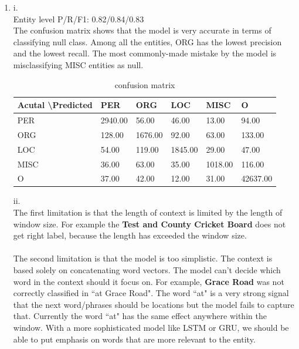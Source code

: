 \documentclass[10pt]{article}
\begin{document}
\begin{enumerate}[label=(\alph*)]
\item
i.\\
Entity level P/R/F1: 0.82/0.84/0.83\\
The confusion matrix shows that the model is very accurate in terms of classifying null class. Among all the entities,  ORG has the lowest precision and the lowest recall. The most commonly-made mistake by the model is misclassifying MISC entities as null.
\begin{table}[h]
	\centering
	\caption{confusion matrix}
	\begin{tabular}{|l|l|l|l|l|l|}
	\hline
	Acutal \textbackslash Predicted & PER     & ORG     & LOC     & MISC    & O        \\ \hline
	PER   & 2940.00 & 56.00   & 46.00   & 13.00   & 94.00    \\ \hline
	ORG   & 128.00  & 1676.00 & 92.00   & 63.00   & 133.00   \\ \hline
	LOC   & 54.00   & 119.00  & 1845.00 & 29.00   & 47.00    \\ \hline
	MISC  & 36.00   & 63.00   & 35.00   & 1018.00 & 116.00   \\ \hline
	O     & 37.00   & 42.00   & 12.00   & 31.00   & 42637.00 \\ \hline
	\end{tabular}
\end{table}

ii.\\
The first limitation is that the length of context is limited by the length of window size.
For example the \textbf{Test and County Cricket Board} does not get right label, because the length has exceeded the window size.\\
\\
The second limitation is that the model is too simplistic. The context is based solely on concatenating word vectors. The model can't decide which word in the context should it focus on. For example, \textbf{Grace Road} was not correctly classified in ``at Grace Road". The word ``at" is a very strong signal that the next word/phrases should be locations but the model fails to capture that. Currently the word ``at" has the same effect anywhere within the window. With a more sophisticated model like LSTM or GRU, we should be able to put emphasis on words that are more relevant to the entity.

\end{enumerate}
\clearpage
\end{document}
